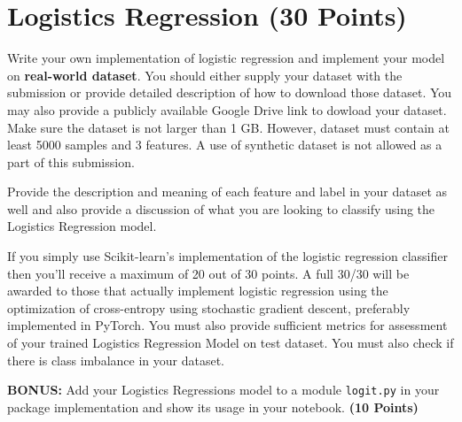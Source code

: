 \documentclass[12pt, xcolor=dvipsnames,svgnames,x11names]{article}
\begin{document}
\section{Logistics Regression \textbf{(30 Points)}}

Write your own implementation of logistic regression and implement your model on \textbf{real-world dataset}. You should either supply your dataset with the submission or provide detailed description of how to download those dataset. You may also provide a publicly available Google Drive link to dowload your dataset. Make sure the dataset is not larger than 1 GB. However, dataset must contain at least 5000 samples and 3 features. A use of synthetic dataset is not allowed as a part of this submission.

Provide the description and meaning of each feature and label  in your dataset as well and also provide a discussion of what you are looking to classify using the Logistics Regression model.

If you simply use Scikit-learn’s implementation of the logistic regression classifier then you’ll
receive a maximum of 20 out of 30 points. A full 30/30 will be awarded to those that actually implement logistic regression using the optimization of cross-entropy using stochastic gradient descent, preferably implemented in PyTorch. You must also provide sufficient metrics for assessment of your trained Logistics Regression Model on test dataset. You must also check if there is class imbalance in your dataset.

\textbf{BONUS:} Add your Logistics Regressions model to a module \texttt{logit.py} in your package implementation and show its usage in your notebook.  \textbf{(10 Points)}
\end{document}
